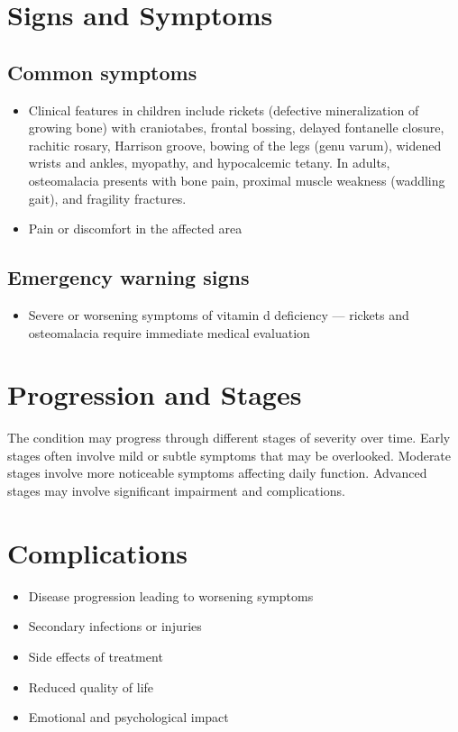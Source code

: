 \section{Signs and Symptoms}
\subsection{Common symptoms}
\begin{itemize}[noitemsep]
  \item Clinical features in children include rickets (defective mineralization of growing bone) with craniotabes, frontal bossing, delayed fontanelle closure, rachitic rosary, Harrison groove, bowing of the legs (genu varum), widened wrists and ankles, myopathy, and hypocalcemic tetany. In adults, osteomalacia presents with bone pain, proximal muscle weakness (waddling gait), and fragility fractures.
  \item Pain or discomfort in the affected area
  \end{itemize}
\subsection{Emergency warning signs}
\begin{itemize}[noitemsep]
  \item Severe or worsening symptoms of vitamin d deficiency --- rickets and osteomalacia require immediate medical evaluation
\end{itemize}
\section{Progression and Stages}
The condition may progress through different stages of severity over time. Early stages often involve mild or subtle symptoms that may be overlooked. Moderate stages involve more noticeable symptoms affecting daily function. Advanced stages may involve significant impairment and complications.
\section{Complications}
\begin{itemize}[noitemsep]
  \item Disease progression leading to worsening symptoms
  \item Secondary infections or injuries
  \item Side effects of treatment
  \item Reduced quality of life
  \item Emotional and psychological impact
\end{itemize}
